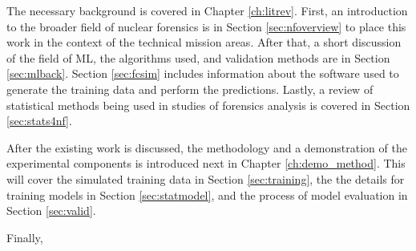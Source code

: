 The necessary background is covered in Chapter \ref{ch:litrev}.  First, an
introduction to the broader field of nuclear forensics is in Section
\ref{sec:nfoverview} to place this work in the context of the technical mission
areas. After that, a short discussion of the field of \gls{ML}, the algorithms
used, and validation methods are in Section \ref{sec:mlback}.  Section
\ref{sec:fcsim} includes information about the software used to generate the
training data and perform the predictions.  Lastly, a review of statistical
methods being used in studies of forensics analysis is covered in Section
\ref{sec:stats4nf}. 

After the existing work is discussed, the methodology and a demonstration of
the experimental components is introduced next in Chapter \ref{ch:demo_method}.
This will cover the simulated training data in Section \ref{sec:training}, the
the details for training models in Section \ref{sec:statmodel}, and the
process of model evaluation in Section \ref{sec:valid}.  

Finally, 
